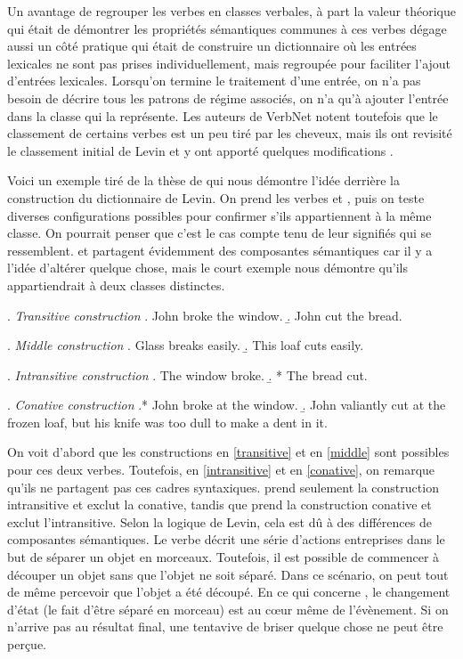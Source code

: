 Un avantage de regrouper les verbes en classes verbales, à part la valeur théorique qui était de démontrer les propriétés sémantiques communes à ces verbes  dégage aussi un côté pratique qui était de construire un dictionnaire où les entrées lexicales ne sont pas prises individuellement, mais regroupée pour faciliter l'ajout d'entrées lexicales. Lorsqu'on termine le traitement d'une entrée, on n'a pas besoin de décrire tous les patrons de régime associés, on n'a qu'à ajouter l'entrée dans la classe qui la représente. Les auteurs de VerbNet notent toutefois que le classement de certains verbes est un peu tiré par les cheveux, mais ils ont revisité le classement initial de Levin et y ont apporté quelques modifications \citep{SchulerVerbnetBroadcoverageComprehensive2005}. 

Voici un exemple tiré de la thèse de \cite{SchulerVerbnetBroadcoverageComprehensive2005} qui nous démontre l'idée derrière la construction du dictionnaire de Levin. On prend les verbes  et , puis on teste diverses configurations possibles pour confirmer s'ils appartiennent à la même classe. On pourrait penser que c'est le cas compte tenu de leur signifiés qui se ressemblent.  et  partagent évidemment des composantes sémantiques car il y a l'idée d'altérer quelque chose, mais le court exemple nous démontre qu'ils appartiendrait à deux classes distinctes.

\ex. \label{transitive} \emph{Transitive construction}
	\a. John broke the window.
	\b. John cut the bread.
	
\ex. \label{middle} \emph{Middle construction}
	\a. Glass breaks easily.
	\b. This loaf cuts easily.
	
\ex. \label{intransitive} \emph{Intransitive construction}
	\a. The window broke.
	\b. * The bread cut.

\ex. \label{conative} \emph{Conative construction}
	\a.* John broke at the window.
	\b. John valiantly cut at the frozen loaf, but his knife was too dull to make a dent in it.

On voit d'abord que les constructions en \ref{transitive} et en \ref{middle} sont possibles pour ces deux verbes. Toutefois, en \ref{intransitive} et en \ref{conative}, on remarque qu'ils ne partagent pas ces cadres syntaxiques.  prend seulement la construction intransitive et exclut la conative, tandis que  prend la construction conative et exclut l'intransitive. Selon la logique de Levin, cela est dû à des différences de composantes sémantiques. Le verbe  décrit une série d'actions entreprises dans le but de séparer un objet en morceaux. Toutefois, il est possible de commencer à découper un objet sans que l'objet ne soit séparé. Dans ce scénario, on peut tout de même percevoir que l'objet a été découpé. En ce qui concerne , le changement d'état (le fait d'être séparé en morceau) est au c\oe{}ur même de l'évènement. Si on n'arrive pas au résultat final, une tentavive de briser quelque chose ne peut être perçue. 

